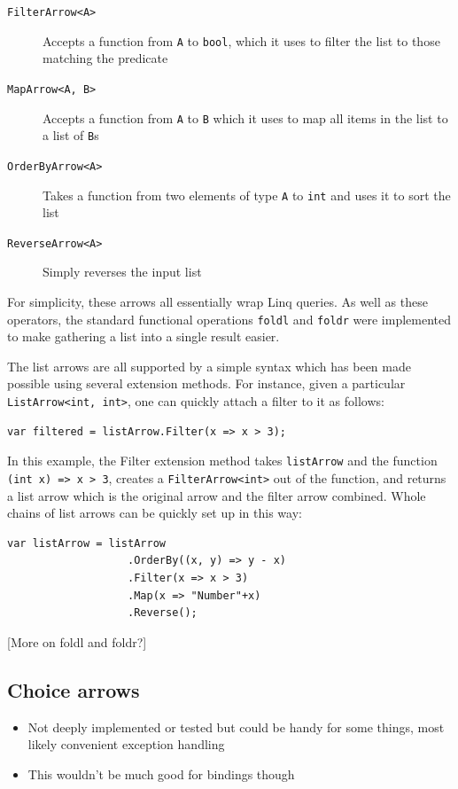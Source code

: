\documentclass[12pt,twoside,notitlepage]{report}
\begin{document}
\begin{description}
	\item[\texttt{FilterArrow<A>}] Accepts a function from \texttt{A} to \texttt{bool}, which it uses to filter the list to those matching the predicate
	\item[\texttt{MapArrow<A, B>}] Accepts a function from \texttt{A} to \texttt{B} which it uses to map all items in the list to a list of \texttt{B}s
	\item[\texttt{OrderByArrow<A>}] Takes a function from two elements of type \texttt{A} to \texttt{int} and uses it to sort the list
	\item[\texttt{ReverseArrow<A>}] Simply reverses the input list
\end{description}

For simplicity, these arrows all essentially wrap Linq queries. As well as these operators, the standard functional operations \texttt{foldl} and \texttt{foldr} were implemented to make gathering a list into a single result easier.

The list arrows are all supported by a simple syntax which has been made possible using several extension methods. For instance, given a particular \texttt{ListArrow<int, int>}, one can quickly attach a filter to it as follows:

\begin{lstlisting}[language={[Sharp]C}]
var filtered = listArrow.Filter(x => x > 3);
\end{lstlisting}

In this example, the Filter extension method takes \texttt{listArrow} and the function \texttt{(int x) => x > 3}, creates a \texttt{FilterArrow<int>} out of the function, and returns a list arrow which is the original arrow and the filter arrow combined. Whole chains of list arrows can be quickly set up in this way:

\begin{lstlisting}[language={[Sharp]C}]
var listArrow = listArrow
                   .OrderBy((x, y) => y - x)
                   .Filter(x => x > 3)
                   .Map(x => "Number"+x)
                   .Reverse();
\end{lstlisting}

[More on foldl and foldr?]

\subsection{Choice arrows}

\begin{itemize}
	\item Not deeply implemented or tested but could be handy for some things, most likely convenient exception handling
	\item This wouldn't be much good for bindings though
\end{itemize}
\end{document}

